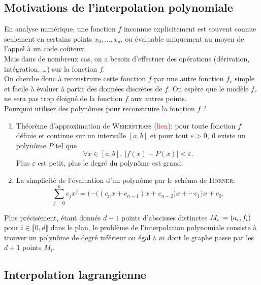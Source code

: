 \subsection{Motivations de l'interpolation polynomiale}
En analyse numérique, une fonction $f$ inconnue explicitement est souvent connue seulement en certains points $x_0, \dots, x_d$, ou évaluable uniquement au moyen de l'appel à un code coûteux. \\
Mais dans de nombreux cas, on a besoin d'effectuer des opérations (dérivation, intégration, \dots) sur la fonction $f$. \\
On cherche donc à reconstruire cette fonction $f$ par une autre fonction $f_r$ simple et facile à évaluer à partir des données discrètes de $f$. On espère que le modèle $f_r$ ne sera pas trop éloigné de la fonction $f$ aux autres points. \\

Pourquoi utiliser des polynômes pour reconstruire la fonction $f$ ?

\begin{enumerate}
    \item Théorème d'approximation de \textsc{Weierstrass} (\textcolor{red}{lien}): pour toute fonction $f$ définie et continue sur un intervalle $[a, b]$ et pour tout $\varepsilon > 0$, il existe un polynôme $P$ tel que 
    $$\forall x \in [a, b],\ |f(x) - P(x)| < \varepsilon.$$
    Plus $\varepsilon$ est petit, plus le degré du polynôme est grand.
    \item La simplicité de l'évaluation d'un polynôme par le schéma de \textsc{Hörner}:
    $$\sum_{j=0}^n c_j x^j = \Big( \cdots \big( (c_n x + c_{n-1})x + c_{n-2} \big)x + \cdots c_1 \Big)x + c_0.$$
\end{enumerate}

\begin{marginfigure}[-1cm]
    \centering
    
\end{marginfigure}

Plus précisément, étant donnés $d+1$ points d'abscisses distinctes $M_i \defeq (a_i, f_i)$ pour $i \in \llbracket 0, d \rrbracket$ dans le plan, le problème de l'interpolation polynomiale consiste à trouver un polynôme de degré inférieur ou égal à $m$ dont le graphe passe par les $d+1$ points $M_i$.\\

\subsection{Interpolation lagrangienne}

